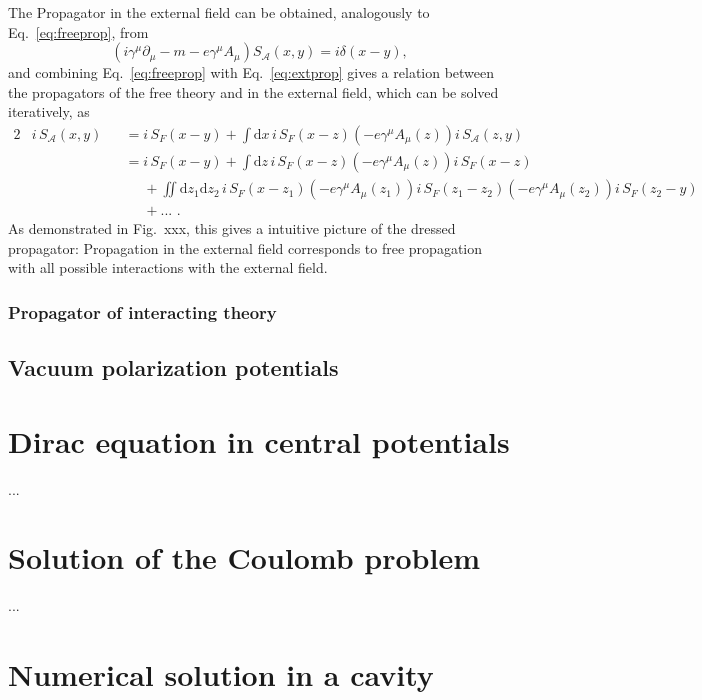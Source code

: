 The Propagator in the external field can be obtained, analogously to Eq.~\eqref{eq:freeprop}, from
\begin{equation}
\left(i\gamma^\mu \partial_\mu -m - e \gamma^\mu A_\mu\right)S_{\mathcal{A}}(x,y)=i\delta(x-y), 
\label{eq:extprop}
\end{equation}
and combining Eq.~\eqref{eq:freeprop} with Eq.~\eqref{eq:extprop} gives a relation between the propagators of the free theory and in the external field, which can be solved iteratively, as
\begin{alignat}{2}
&i\,S_{\mathcal{A}}(x,y)&&= i\,S_F(x-y) 
+ \int\mathrm{d}x\, i\,S_F(x-z)\left(-e\gamma^\mu A_\mu(z)\right)i\,S_{\mathcal{A}}(z,y)\\
& &&=i\,S_F(x-y)+\int\mathrm{d}z\,i\,S_F(x-z)(-e\gamma^\mu A_\mu(z))i\,S_F(x-z)\\
&&&\phantom{=}+\iint\mathrm{d}z_1\mathrm{d}z_2\,i\,S_F(x-z_1)(-e\gamma^\mu A_\mu(z_1))i\,S_F(z_1-z_2)(-e\gamma^\mu A_\mu(z_2))i\,S_F(z_2-y)\\
&&&\phantom{=}+...\,\,.
\end{alignat}
As demonstrated in Fig.~xxx, this gives a intuitive picture of the dressed propagator: Propagation in the external field corresponds to free propagation with all possible interactions with the external field.

\subsubsection*{Propagator of interacting theory}

\subsection{Vacuum polarization potentials}
\section{Dirac equation in central potentials}
...
\section{Solution of the Coulomb problem}
...
\section{Numerical solution in a cavity}






